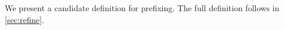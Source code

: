 We present a candidate definition for prefixing.  The full definition follows
in \textsection\ref{sec:refine}.



  


